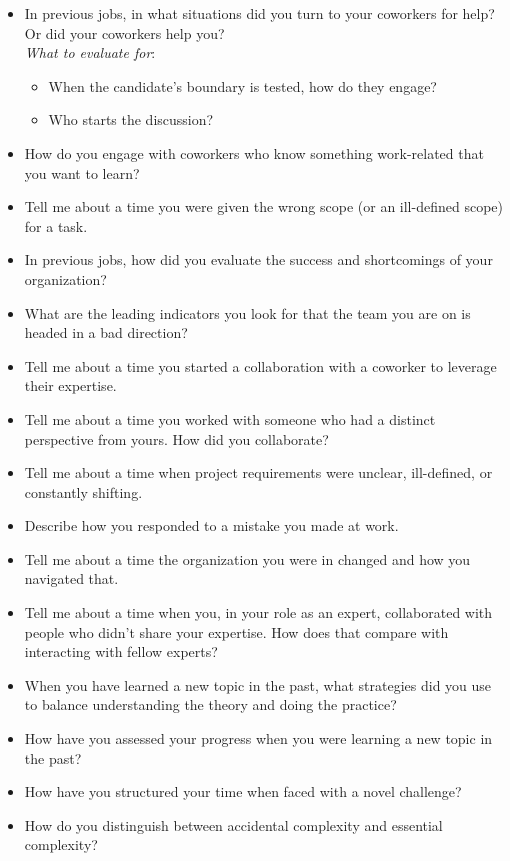 \begin{itemize}
    \item In previous jobs, in what situations did you turn to your coworkers for help? Or did your coworkers help you?\\
    \textit{What to evaluate for}:
    \begin{itemize}
        \item When the candidate's boundary is tested, how do they engage?
        \item Who starts the discussion?
    \end{itemize}
    \item How do you engage with coworkers who know something work-related that you want to learn?
    \item Tell me about a time you were given the wrong scope (or an ill-defined scope) for a task. 
    \item In previous jobs, how did you evaluate the success and shortcomings of your organization?
    \item What are the leading indicators you look for that the team you are on is headed in a bad direction?
    \item Tell me about a time you started a collaboration with a coworker to leverage their expertise.
    \item Tell me about a time you worked with someone who had a distinct perspective from yours. How did you collaborate?
    \item Tell me about a time when project requirements were unclear, ill-defined, or constantly shifting.
    \item Describe how you responded to a mistake you made at work.
    \item Tell me about a time the organization you were in changed and how you navigated that. 
    \item Tell me about a time when you, in your role as an expert, collaborated with people who didn't share your expertise. How does that compare with interacting with fellow experts?
    \item When you have learned a new topic in the past, what strategies did you use to balance understanding the theory and doing the practice?
    \item How have you assessed your progress when you were learning a new topic in the past?
    \item How have you structured your time when faced with a novel challenge?
    \item How do you distinguish between accidental complexity and essential complexity?~\cite{1986_brooks}
\end{itemize}

